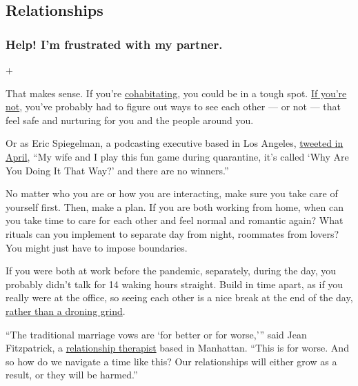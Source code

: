 \hypertarget{relationships}{%
\subsection{Relationships}\label{relationships}}

\hypertarget{help-im-frustrated-with-my-partner}{%
\subsubsection{Help! I'm frustrated with my
partner.}\label{help-im-frustrated-with-my-partner}}

+

That makes sense. If you're
\href{https://www.nytimes.com/2020/05/26/style/coronavirus-living-together-callout.html}{cohabitating},
you could be in a tough spot.
\href{https://www.nytimes.com/2020/04/30/smarter-living/coronavirus-long-distance-relationships.html}{If
you're not}, you've probably had to figure out ways to see each other
--- or not --- that feel safe and nurturing for you and the people
around you.

Or as Eric Spiegelman, a podcasting executive based in Los Angeles,
\href{https://twitter.com/ericspiegelman/status/1246488909221003264?lang=en}{tweeted
in April}, ``My wife and I play this fun game during quarantine, it's
called `Why Are You Doing It That Way?' and there are no winners.''

No matter who you are or how you are interacting, make sure you take
care of yourself first. Then, make a plan. If you are both working from
home, when can you take time to care for each other and feel normal and
romantic again? What rituals can you implement to separate day from
night, roommates from lovers? You might just have to impose boundaries.

If you were both at work before the pandemic, separately, during the
day, you probably didn't talk for 14 waking hours straight. Build in
time apart, as if you really were at the office, so seeing each other is
a nice break at the end of the day,
\href{https://www.nytimes.com/2020/07/08/parenting/coronavirus-marriage-relationships.html}{rather
than a droning grind}.

``The traditional marriage vows are `for better or for worse,''' said
Jean Fitzpatrick, a \href{https://therapistnyc.com/}{relationship
therapist} based in Manhattan. ``This is for worse. And so how do we
navigate a time like this? Our relationships will either grow as a
result, or they will be harmed.''

